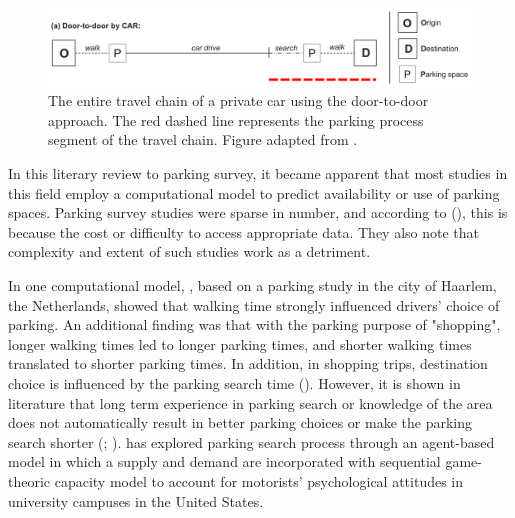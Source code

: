\begin{figure}[H]%
    \includegraphics[width=\textwidth]{images/door2door.png}
    \caption[Door-to-door approach]{The entire travel chain of a private car using the door-to-door approach. The red dashed line represents the parking process segment of the travel chain. Figure adapted from .}%
    \label{fig:door-to-door}%
\end{figure}

In this literary review to parking survey, it became apparent that most studies in this field employ a computational model to predict availability or use of parking spaces. Parking survey studies were sparse in number, and according to \citeauthor{Diallo2015} (\citeyear{Diallo2015}), this is because the cost or difficulty to access appropriate data. They also note that complexity and extent of such studies work as a detriment.

In one computational model, , based on a parking study in the city of Haarlem, the Netherlands, showed that walking time strongly influenced drivers' choice of parking. An additional finding was that with the parking purpose of "shopping", longer walking times led to longer parking times, and shorter walking times translated to shorter parking times. In addition, in shopping trips, destination choice is influenced by the parking search time (\cite{Axhausen1993}). However, it is shown in literature that long term experience in parking search or knowledge of the area does not automatically result in better parking choices or make the parking search shorter (\cite{Thompson1998}; \cite{Teng2002}).  has explored parking search process through an agent-based model in which a supply and demand are incorporated with sequential game-theoric capacity model to account for motorists' psychological attitudes in university campuses in the United States. 

